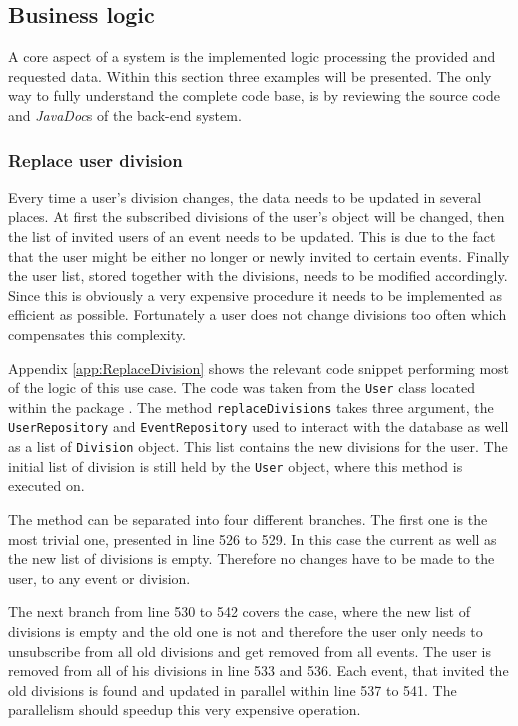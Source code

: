 \subsection{Business logic}

A core aspect of a system is the implemented logic processing the provided and requested data. Within this section three examples will be presented. The only way to fully understand the complete code base, is by reviewing the source code and \emph{JavaDoc}s of the back-end system. 

\subsubsection{Replace user division}
Every time a user's division changes, the data needs to be updated in several places. At first the subscribed divisions of the user's object will be changed, then the list of invited users of an event needs to be updated. This is due to the fact that the user might be either no longer or newly invited to certain events. Finally the user list, stored together with the divisions, needs to be modified accordingly. Since this is obviously a very expensive procedure it needs to be implemented as efficient as possible. Fortunately a user does not change divisions too often which compensates this complexity.

Appendix \vref{app:ReplaceDivision} shows the relevant code snippet performing most of the logic of this use case. The code was taken from the \texttt{User} class located within the package . The method \texttt{replaceDivisions} takes three argument, the \texttt{UserRepository} and \texttt{EventRepository} used to interact with the database as well as a list of \texttt{Division} object. This list contains the new divisions for the user. The initial list of division is still held by the \texttt{User} object, where this method is executed on.

The method can be separated into four different branches. The first one is the most trivial one, presented in line 526 to 529. In this case the current as well as the new list of divisions is empty. Therefore no changes have to be made to the user, to any event or division.

The next branch from line 530 to 542 covers the case, where the new list of divisions is empty and the old one is not and therefore the user only needs to unsubscribe from all old divisions and get removed from all events. The user is removed from all of his divisions in line 533 and 536. Each event, that invited the old divisions is found and updated in parallel within line 537 to 541. The parallelism should speedup this very expensive operation.

